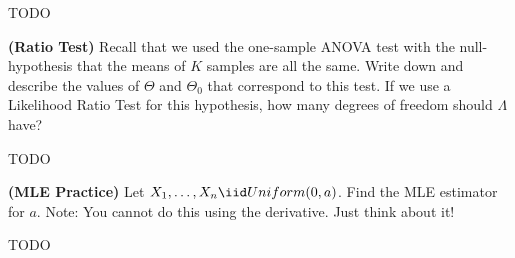 
TODO


\textbf{(Ratio Test)} Recall that we used the one-sample ANOVA test with the
null-hypothesis that the means of $K$ samples are all the same. Write down and
describe the values of $\Theta$ and $\Theta_0$ that correspond to this test. 
If we use a Likelihood Ratio Test for this hypothesis, how many degrees of
freedom should $\Lambda$ have?


TODO


\textbf{(MLE Practice)} Let $X_1, \ldots, X_n \iid Uniform(0, a)$. Find the MLE
estimator for $a$. Note: You cannot do this using the derivative. Just think about it!


TODO
